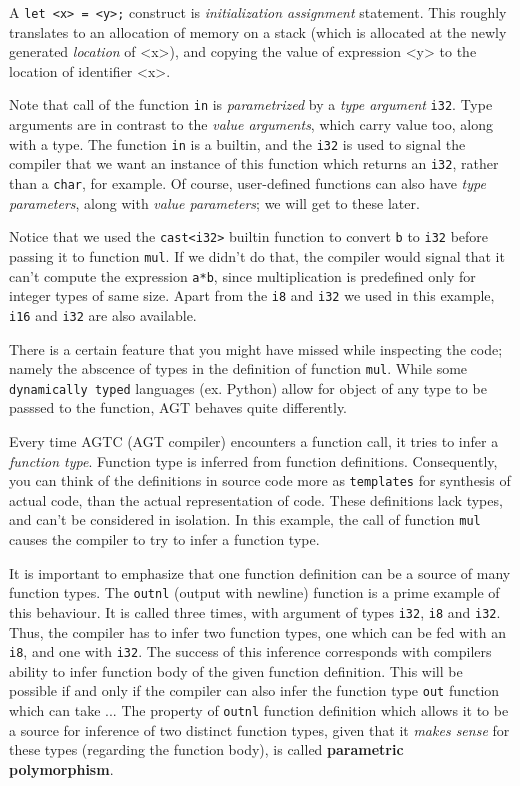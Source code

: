 \documentclass[times, utf8, diplomski]{fer}
\theoremstyle{definition}
\begin{document}
A \texttt{let <x> = <y>;} construct is \textit{initialization assignment} statement.
This roughly translates to an allocation of memory on a stack (which is allocated at the newly
generated \textit{location} of <x>), and copying the value of expression <y>
to the location of identifier <x>.

Note that call of the function \texttt{in} is \textit{parametrized} by a \textit{type argument} \texttt{i32}.
Type arguments are in contrast to the \textit{value arguments}, which carry value too, along with a type.
The function \texttt{in} is a builtin, and the \texttt{i32} is used to signal the compiler
that we want an instance of this function which returns an \texttt{i32}, 
rather than a \texttt{char}, for example. 
Of course, user-defined functions can also have \textit{type parameters}, along with \textit{value parameters};
we will get to these later.

Notice that we used the \texttt{cast<i32>} builtin function to convert \texttt{b} to \texttt{i32}
before passing it to function \texttt{mul}. If we didn't do that, the compiler would signal that it can't
compute the expression \texttt{a*b}, since multiplication is predefined only for integer types of same size.
Apart from the \texttt{i8} and \texttt{i32} we used in this example, \texttt{i16} and \texttt{i32} are also
available.

There is a certain feature that you might have missed while inspecting the code; namely the abscence of
types in the definition of function \texttt{mul}.
While some \texttt{dynamically typed} languages (ex. Python) allow for object of any type to be passsed
to the function, AGT behaves quite differently. 

Every time AGTC (AGT compiler) encounters a function call,
it tries to infer a \textit{function type}. Function type is inferred from function definitions. 
Consequently, you can think of the definitions in source code more as \texttt{templates} for synthesis
of actual code, than the actual representation of code. 
These definitions lack types, and can't be considered in isolation.
In this example, the call of function \texttt{mul} causes the compiler to try to infer a function type.

It is important to emphasize that one function definition can be a source of many function types.
The \texttt{outnl} (output with newline) function is a prime example of this behaviour.
It is called three times, with argument of types \texttt{i32}, \texttt{i8} and \texttt{i32}.
Thus, the compiler has to infer two function types, 
one which can be fed with an \texttt{i8}, and one with \texttt{i32}.
The success of this inference corresponds with compilers ability to infer function body of
the given function definition.
This will be possible if and only if the compiler can also infer the function type \texttt{out} 
function which can take ...
The property of \texttt{outnl} function definition which allows it to be a source for inference
of two distinct function types, given that it \textit{makes sense} for these types 
(regarding the function body), is called \textbf{parametric polymorphism}.
\end{document}
